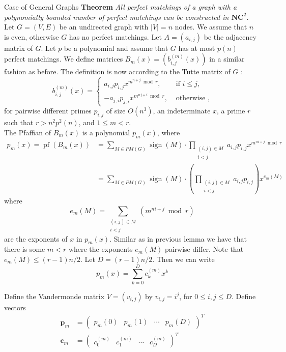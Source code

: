\documentclass{beamer}
\begin{document}
\begin{frame}[allowframebreaks]{Case of General Graphs }
	\textbf{Theorem} \textit{All perfect matchings of a graph with a polynomially bounded number of perfect matchings can be constructed in $\mathbf{N C}^2$.} \\
	
	Let $G=(V, E)$ be an undirected graph with $|V|=n$ nodes. We assume that $n$ is even, otherwise $G$ has no perfect matchings. Let $A=\left(a_{i, j}\right)$ be the adjacency matrix of $G$. Let $p$ be a polynomial and assume that $G$ has at most $p(n)$ perfect matchings. We define matrices $B_m(x)=\left(b_{i, j}^{(m)}(x)\right)$ in a similar fashion as before. The definition is now according to the Tutte matrix of $G$ :
	$$
	b_{i, j}^{(m)}(x)= \begin{cases}a_{i, j} p_{i, j} x^{m^{n+j} \bmod r}, & \text { if } i \leq j, \\ -a_{j, i} p_{j, i} x^{m^{n j+i} \bmod r}, & \text { otherwise },\end{cases}
	$$
	for pairwise different primes $p_{i, j}$ of size $O\left(n^3\right)$, an indeterminate $x$, a prime $r$ such that $r>n^2 p^2(n)$, and $1 \leq m<r$.\\
	The Pfaffian of $B_m(x)$ is a polynomial $p_m(x)$, where
	$$
	\begin{aligned}
		p_m(x)=\operatorname{pf}\left(B_m(x)\right) & =\sum_{M \in P M(G)} \operatorname{sign}(M) \cdot \prod_{\substack{(i, j) \in M \\
				i<j}} a_{i, j} p_{i, j} x^{m^{n i+j} \bmod r} \\
		& =\sum_{M \in P M(G)} \operatorname{sign}(M) \cdot\left(\prod_{\substack{(i, j) \in M \\
				i<j}} a_{i, j} p_{i, j}\right) x^{e_m(M)}
	\end{aligned}
	$$
	where
	$$
	e_m(M)=\sum_{\substack{(i, j) \in M \\ i<j}}\left(m^{n i+j} \bmod r\right)
	$$
	are the exponents of $x$ in $p_m(x)$. Similar as in previous lemma we have that there is some $m<r$ where the exponents $e_m(M)$ pairwise differ.
	Note that $e_m(M) \leq(r-1) n / 2$. Let $D=(r-1) n / 2$. Then we can write
	$$
	p_m(x)=\sum_{k=0}^D c_k^{(m)} x^k
	$$
	
	Define the Vandermonde matrix $V=\left(v_{i, j}\right)$ by $v_{i, j}=i^j$, for $0 \leq i, j \leq D$. Define vectors
	$$
	\begin{aligned}
		\boldsymbol{p}_m & =\left(\begin{array}{llll}
			p_m(0) & p_m(1) & \cdots & p_m(D)
		\end{array}\right)^T \\
		\boldsymbol{c}_m & =\left(\begin{array}{llll}
			c_0^{(m)} & c_1^{(m)} & \cdots & c_D^{(m)}
		\end{array}\right)^T
	\end{aligned}
	$$
	

\end{frame}
\end{document}
